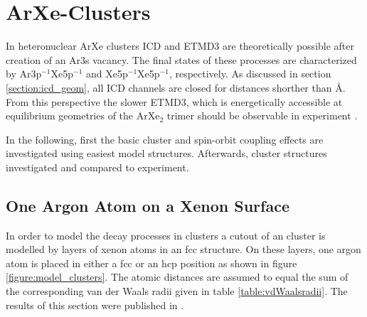 \section{ArXe-Clusters}
In heteronuclear ArXe clusters \ac{ICD} and \ac{ETMD}3 are theoretically
possible after creation of an Ar3s vacancy. The final states of these processes
are characterized by Ar3p$^{-1}$Xe5p$^{-1}$ and Xe5p$^{-1}$Xe5p$^{-1}$,
respectively. As discussed in section \ref{section:icd_geom}, all \ac{ICD}
channels are closed
for distances shorther than \unit[10]{\AA}. From this perspective the
slower \ac{ETMD}3, which is energetically accessible at equilibrium geometries
of the ArXe$_2$ trimer should be
observable in experiment \cite{Fasshauer10}. 

In the following, first the basic cluster and spin-orbit coupling effects
are investigated using easiest model
structures. Afterwards, cluster structures investigated and compared to experiment.


\subsection{One Argon Atom on a Xenon Surface}
In order to model the decay processes in clusters a cutout of an cluster
is modelled by layers of xenon atoms in an \ac{fcc} structure. On these
layers, one argon atom is placed in either a \ac{fcc} or an \ac{hcp} position
as shown in figure \ref{figure:model_clusters}. The atomic distances are
assumed to equal the sum of the corresponding van der Waals radii given in
table \ref{table:vdWaalsradii}. The results of this section were published
in \cite{Fasshauer13}.

